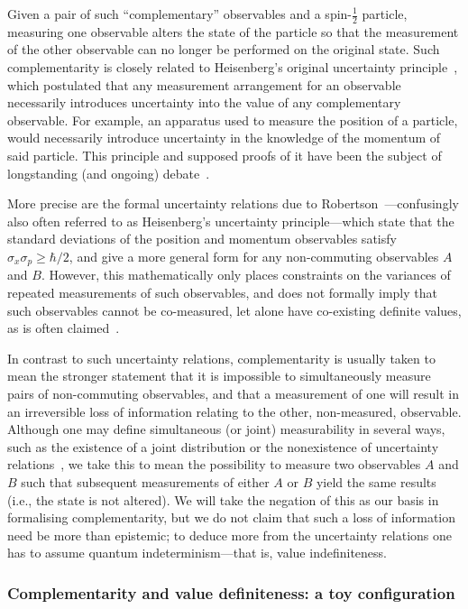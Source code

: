 \documentclass[information,article,submit,moreauthors,pdftex,12pt,a4paper]{mdpi}
\theoremstyle{mdpi}
\newcounter{ex}
\newcounter{re}
\theoremstyle{mdpidefinition}
\begin{document}
Given a pair of such ``complementary'' observables and a spin-$\frac{1}{2}$ particle, measuring one observable alters the state of the particle so that the measurement of the other observable can no longer be performed on the original state.
Such complementarity is closely related to Heisenberg's original uncertainty principle~\cite{Heisenberg-27}, which postulated that any measurement arrangement for an observable necessarily introduces uncertainty into the value of any complementary observable.
For example, an apparatus used to measure the position of a particle, would necessarily introduce uncertainty in the knowledge of the momentum of said particle.
This principle and supposed proofs of it have been the subject of longstanding (and ongoing) debate~\cite{Busch:2014lr,Cowen:2013fe,Rozema:2012hb}.

More precise are the formal uncertainty relations due to Robertson~\cite{Robertson:1929ee}---confusingly also often referred to as Heisenberg's uncertainty principle---which state that the standard deviations of the position and momentum observables satisfy $\sigma_x\sigma_p \ge \hbar/2$, and give a more general form for any non-commuting observables $A$ and $B$.
However, this mathematically only places constraints on the variances of repeated measurements of such observables, and does not formally imply that such observables cannot be co-measured, let alone have co-existing definite values, as is often claimed~\cite[Ch. 3]{Popper:1992ty}.

In contrast to such uncertainty relations, complementarity is usually taken to mean the stronger statement that it is impossible to simultaneously measure pairs of non-commuting observables, and that a measurement of one will result in an irreversible loss of information relating to the other, non-measured, observable.
Although one may define simultaneous (or joint) measurability in several ways, such as the existence of a joint distribution or the nonexistence of uncertainty relations~\cite{Fritz:2012fj}, we take this to mean the possibility to measure two observables $A$ and $B$ such that subsequent measurements of either $A$ or $B$ yield the same results (i.e., the state is not altered).
We will take the negation of this as our basis in formalising complementarity, but we do not claim that such a loss of information need be more than epistemic;
to deduce more from the uncertainty relations one has to assume quantum indeterminism---that is, value indefiniteness.


\subsubsection{Complementarity and value definiteness: a toy configuration}
\label{sec:Mealy}
\end{document}
